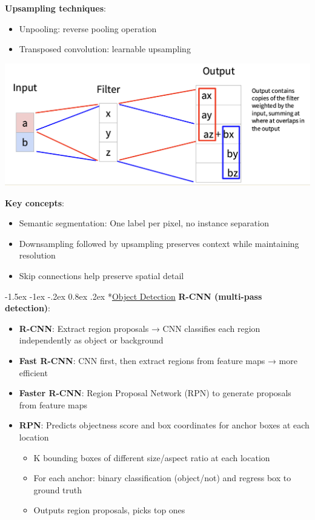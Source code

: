 \documentclass{article}
\makeatletter
\renewcommand\section{\@startsection{section}{1}{\z@}%
                                  {-1.5ex \@plus -1ex \@minus -.2ex}%
                                  {0.8ex \@plus.2ex}%
                                  {\normalfont\small\bfseries}}
\makeatother
\begin{document}
\begin{multicols}{3}
\textbf{Upsampling techniques}:
\begin{itemize}
\item Unpooling: reverse pooling operation
\item Transposed convolution: learnable upsampling
\end{itemize}
\includegraphics[width=\columnwidth]{imgs/upsampl.png}

\textbf{Key concepts}:
\begin{itemize}
\item Semantic segmentation: One label per pixel, no instance separation
\item Downsampling followed by upsampling preserves context while maintaining resolution
\item Skip connections help preserve spatial detail
\end{itemize}

\section*{\underline{Object Detection}}
\textbf{R-CNN (multi-pass detection)}:
\begin{itemize}
\item \textbf{R-CNN}: Extract region proposals → CNN classifies each region independently as object or background
\item \textbf{Fast R-CNN}: CNN first, then extract regions from feature maps → more efficient
\item \textbf{Faster R-CNN}: Region Proposal Network (RPN) to generate proposals from feature maps
\item \textbf{RPN}: Predicts objectness score and box coordinates for anchor boxes at each location
  \begin{itemize}
    \item K bounding boxes of different size/aspect ratio at each location
    \item For each anchor: binary classification (object/not) and regress box to ground truth
    \item Outputs region proposals, picks top ones
  \end{itemize}
\end{itemize}


\end{multicols}
\end{document}
